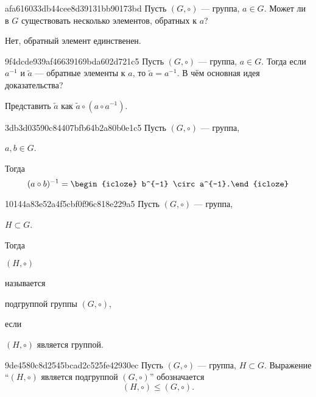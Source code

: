 \begin{note}{afa616033db44cee8d39131bb90173bd}
    Пусть \({ (G, \circ) }\) --- группа, \({ a \in G }\).
    Может ли в \({ G }\) существовать несколько элементов, обратных к \({ a }\)?

    \begin{cloze}{1}
        Нет, обратный элемент единственен.
    \end{cloze}
\end{note}

\begin{note}{9f4dcde939af46639169bda602d721c5}
    Пусть \({ (G, \circ)}\) --- группа, \({ a \in G }\).
    Тогда если \({ a^{-1} }\) и \({ \tilde a }\) --- обратные элементы к \({ a }\), то \({ \tilde a = a^{-1} }\). В чём основная идея доказательства?

    \begin{cloze}{1}
        Представить \({ \tilde a }\) как \({ \tilde a \circ \left( a \circ a^{-1} \right) }\).
    \end{cloze}
\end{note}

\begin{note}{3db3d03590c84407bfb64b2a80b0e1c5}
    Пусть \({ (G, \circ) }\) --- группа, \begin{icloze}{2}\({ a, b \in G }\).\end{icloze} Тогда
    \[
        (a \circ b)^{-1} =  \begin{icloze}{1}b^{-1} \circ a^{-1}.\end{icloze}
    \]
\end{note}

\begin{note}{10144a83e52a4f5cbf0f96c818e229a5}
    Пусть \({ (G, \circ) }\) --- группа, \begin{icloze}{3}\({ H \subset G }\).\end{icloze}
    Тогда \begin{icloze}{4}\({ (H, \circ) }\)\end{icloze} называется \begin{icloze}{2}подгруппой группы \({ (G, \circ) }\),\end{icloze} если \begin{icloze}{1}\({ (H, \circ) }\) является группой.\end{icloze}
\end{note}

\begin{note}{9de4580c8d2545bcad2c525fe42930ec}
    Пусть \({ (G, \circ) }\) --- группа, \({ H \subset G }\).
    Выражение ``\({ (H, \circ) }\) является подгруппой \({ (G, \circ) }\)'' обозначается
    \[
        (H, \circ) \leqslant (G, \circ).
    \]
\end{note}

